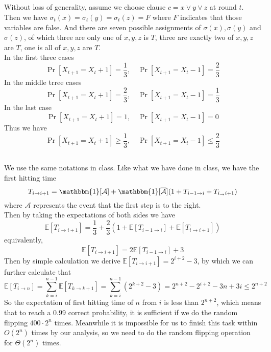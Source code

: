 \documentclass[12pt,letterpaper]{article}
\begin{document}
\subsection{}
Without loss of generality, assume we choose clause $c=x\vee y\vee z$ at round $t$.
Then we have $\sigma_t(x)=\sigma_t(y)=\sigma_t(z)=F$ where $F$ indicates that those variables are false.
And there are seven possible assignments of $\sigma(x),\sigma(y)$ and $\sigma(z)$,
of which three are only one of $x,y,z$ is $T$,
three are exactly two of $x,y,z$ are $T$,
one is all of $x,y,z$ are $T$.\\
In the first three cases 
$$\Pr\left[X_{t+1}=X_{t}+1\right]=\frac{1}{3},\quad \Pr\left[X_{t+1}=X_{t}-1\right]=\frac{2}{3}$$
In the middle trree cases  
$$\Pr\left[X_{t+1}=X_{t}+1\right]=\frac{2}{3},\quad \Pr\left[X_{t+1}=X_{t}-1\right]=\frac{1}{3}$$
In the last case 
$$\Pr\left[X_{t+1}=X_{t}+1\right]=1,\quad \Pr\left[X_{t+1}=X_{t}-1\right]=0$$
Thus we have 
$$\Pr\left[X_{t+1}=X_{t}+1\right]\geq \frac{1}{3},\quad \Pr\left[X_{t+1}=X_{t}-1\right]\leq\frac{2}{3}$$

\subsection{}
We use the same notations in class.
Like what we have done in class, we have the first hitting time 
$$T_{i\to i+1}=\mathbbm{1}[\mathcal{A}]+\mathbbm{1}[\overline{\mathcal{A}}](1+T_{i-1\to i}+T_{i_\to i+1})$$
where $\mathcal{A}$ represents the event that the first step is to the right.\\
Then by taking the expectations of both sides we have 
$$\mathbb{E}\left[T_{i\to i+1}\right]=\frac{1}{3}+\frac{2}{3}(1+\mathbb{E}\left[T_{i-1\to i}\right]+\mathbb{E}\left[T_{i\to i+1}\right])$$
equivalently,
$$\mathbb{E}\left[T_{i\to i+1}\right]=2\mathbb{E}\left[T_{i-1\to i}\right]+3$$
Then by simple calculation we derive $\mathbb{E}\left[T_{i\to i+1}\right]=2^{i+2}-3$,
by which we can further calculate that 
$$\mathbb{E}\left[T_{i\to n}\right]=\sum_{k=i}^{n-1}\mathbb{E}\left[T_{k\to k+1}\right]=\sum_{k=i}^{n-1}(2^{k+2}-3)=2^{n+2}-2^{i+2}-3n+3i\leq 2^{n+2}$$
So the expectation of first hitting time of $n$ from $i$ is less than $2^{n+2}$,
which means that to reach a 0.99 correct probability, 
it is sufficient if we do the random flipping  $400\cdot2^n$ times.
Meanwhile it is impossible for us to finish this task within $O(2^n)$ times by our analysis,
so we need to do the random flipping operation for $\Theta(2^n)$ times.
\end{document}
